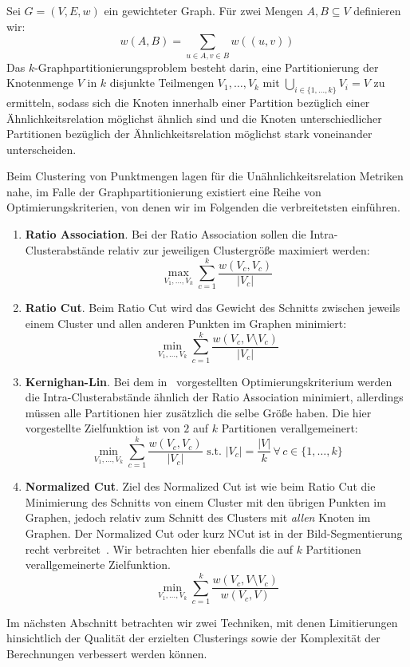 \begin{definition}[$k$-Graphpartitionierung]
	Sei $G=(V,E,w)$ ein gewichteter Graph. Für zwei Mengen $A, B \subseteq V$ definieren wir:
	\[ w(A,B) = \sum_{u \in A, v \in B} w((u,v)) \]
	Das $k$-Graphpartitionierungsproblem besteht darin, eine Partitionierung der Knotenmenge $V$ in $k$ disjunkte Teilmengen
	$V_1, \dots, V_k$ mit $\bigcup_{i \in \{1, \dots, k \}} V_i = V$ zu ermitteln, sodass sich die Knoten innerhalb einer
	Partition bezüglich einer Ähnlichkeitsrelation möglichst ähnlich sind und die Knoten unterschiedlicher Partitionen
	bezüglich der Ähnlichkeitsrelation möglichst stark voneinander unterscheiden.
	
	Beim Clustering von Punktmengen lagen für die Unähnlichkeitsrelation Metriken nahe, im Falle der Graphpartitionierung
	existiert eine Reihe von Optimierungskriterien, von denen wir im Folgenden die verbreitetsten einführen.
	
	\begin{enumerate}
		\item 	\textbf{Ratio Association}. Bei der Ratio Association sollen die Intra-Clusterabstände relativ zur jeweiligen
				Clustergröße maximiert werden:
				\[ \max_{V_1, \dots, V_k} \sum_{c=1}^{k} \frac{w(V_c, V_c)}{\left|V_c\right|} \]
		\item 	\textbf{Ratio Cut}. Beim Ratio Cut wird das Gewicht des Schnitts zwischen jeweils einem Cluster und allen
				anderen Punkten im Graphen minimiert:
				\[ \min_{V_1, \dots, V_k} \sum_{c=1}^{k} \frac{w(V_c, V \setminus V_c)}{\left|V_c\right|} \]
		\item 	\textbf{Kernighan-Lin}. Bei dem in~\cite{KernighanL70} vorgestellten Optimierungskriterium werden die
				Intra-Clusterabstände ähnlich der Ratio Association minimiert, allerdings müssen alle Partitionen hier zusätzlich
				die selbe Größe haben. Die hier vorgestellte Zielfunktion ist von $2$ auf $k$ Partitionen verallgemeinert:
				\[ \min_{V_1, \dots, V_k} \sum_{c=1}^{k} \frac{w(V_c, V_c)}{\left|V_c\right|} \textrm{ s.t. } 
				   \left|V_c\right| = \frac{\left|V\right|}{k} \, \forall \, c \in \{ 1, \dots, k \} \]
		\item 	\textbf{Normalized Cut}. Ziel des Normalized Cut ist wie beim Ratio Cut die Minimierung des Schnitts von einem
				Cluster mit den übrigen Punkten im Graphen, jedoch relativ zum Schnitt des Clusters mit \emph{allen}
				Knoten im Graphen. Der Normalized Cut oder kurz NCut ist in der Bild-Segmentierung recht verbreitet~\cite{ShiM00}.
				Wir betrachten hier ebenfalls die auf $k$ Partitionen verallgemeinerte Zielfunktion.
				\[ \min_{V_1, \dots, V_k} \sum_{c=1}^{k} \frac{w(V_c, V \setminus V_c)}{w(V_c, V)} \]
	\end{enumerate}
\end{definition}
Im nächsten Abschnitt betrachten wir zwei Techniken, mit denen Limitierungen hinsichtlich der Qualität der erzielten Clusterings
sowie der Komplexität der Berechnungen verbessert werden können.

